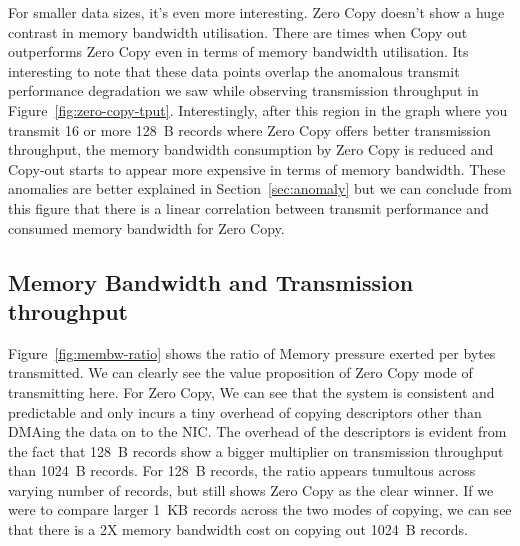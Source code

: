For smaller data sizes, it's even more interesting. Zero Copy doesn't show a huge contrast in memory bandwidth utilisation. There are times 
when Copy out outperforms Zero Copy even in terms of memory bandwidth utilisation. Its interesting to note that these data points overlap the anomalous transmit performance 
degradation we saw while observing transmission throughput in Figure~\ref{fig:zero-copy-tput}. Interestingly, after this region in the graph 
where you transmit 16 or more 128~B records where Zero Copy offers better transmission throughput, the memory bandwidth consumption by Zero Copy 
is reduced and Copy-out starts to appear more expensive in terms of memory bandwidth. These anomalies are better explained in Section~\ref{sec:anomaly} but we 
can conclude from this figure that there is a linear correlation between transmit performance and consumed memory bandwidth for Zero Copy.



\subsection{Memory Bandwidth and Transmission throughput}
\label{sec:membw-savings}
Figure~\ref{fig:membw-ratio} shows the ratio of Memory pressure exerted per bytes transmitted. We can clearly see the value proposition of 
Zero Copy mode of transmitting here. For Zero Copy, We can see that the system is consistent and predictable and only incurs a tiny overhead of 
copying descriptors other than DMAing the data on to the NIC. The overhead of the descriptors is evident from the fact that 128~B records show 
a bigger multiplier on transmission throughput than 1024~B records. For 128~B records, the ratio appears tumultous across varying number of records, 
 but still shows Zero Copy as the clear winner. If we were to compare larger 1~KB records across the two modes of copying, we can see that there is a 
 2X memory bandwidth cost on copying out 1024~B records. 




